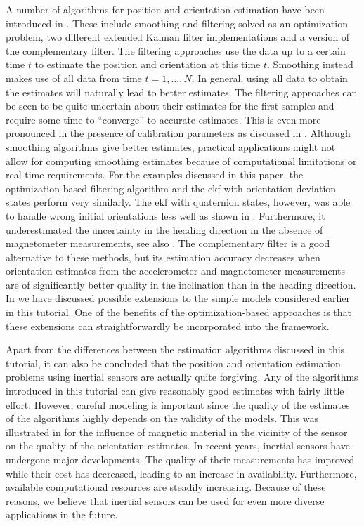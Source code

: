 A number of algorithms for position and orientation estimation have been introduced in . These include smoothing and filtering solved as an optimization problem, two different extended Kalman filter implementations and a version of the complementary filter. The filtering approaches use the data up to a certain time $t$ to estimate the position and orientation at this time $t$. Smoothing instead makes use of all data from time $t = 1, \hdots , N$. In general, using all data to obtain the estimates will naturally lead to better estimates. The filtering approaches can be seen to be quite uncertain about their estimates for the first samples and require some time to ``converge'' to accurate estimates. This is even more pronounced in the presence of calibration parameters as discussed in . Although smoothing algorithms give better estimates, practical applications might not allow for computing smoothing estimates because of computational limitations or real-time requirements. For the examples discussed in this paper, the optimization-based filtering algorithm and the \gls{ekf} with orientation deviation states perform very similarly. The \gls{ekf} with quaternion states, however, was able to handle wrong initial orientations less well as shown in . Furthermore, it underestimated the uncertainty in the heading direction in the absence of magnetometer measurements, see also . The complementary filter is a good alternative to these methods, but its estimation accuracy decreases when orientation estimates from the accelerometer and magnetometer measurements are of significantly better quality in the inclination than in the heading direction. In  we have discussed possible extensions to the simple models considered earlier in this tutorial. One of the benefits of the optimization-based approaches is that these extensions can straightforwardly be incorporated into the framework. 

Apart from the differences between the estimation algorithms discussed in this tutorial, it can also be concluded that the position and orientation estimation problems using inertial sensors are actually quite forgiving. Any of the algorithms introduced in this tutorial can give reasonably good estimates with fairly little effort. However, careful modeling is important since the quality of the estimates of the algorithms highly depends on the validity of the models. This was illustrated in  for the influence of magnetic material in the vicinity of the sensor on the quality of the orientation estimates. In recent years, inertial sensors have undergone major developments. The quality of their measurements has improved while their cost has decreased, leading to an increase in availability. Furthermore, available computational resources are steadily increasing. Because of these reasons, we believe that inertial sensors can be used for even more diverse applications in the future. 